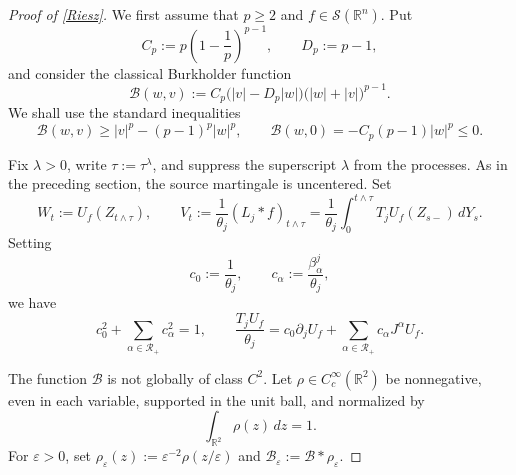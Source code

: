 \documentclass[11pt]{amsart}
\theoremstyle{definition}
\theoremstyle{remark}
\numberwithin{equation}{section}
\newcommand{\R}{\mathbb{R}}
\newcommand{\RR}{\mathcal{R}}
\begin{document}
\begin{proof}[Proof of \cref{Riesz}]
We first assume that $p\geq2$ and $f\in\mathcal S(\R^n)$. Put
\[
C_p:=p\left(1-\frac1p\right)^{p-1},
\qquad D_p:=p-1,
\]
and consider the classical Burkholder function
\[
\mathcal B(w,v)
:=C_p\bigl(|v|-D_p|w|\bigr)\bigl(|w|+|v|\bigr)^{p-1}.
\]
We shall use the standard inequalities
\[
\mathcal B(w,v)\geq|v|^p-(p-1)^p|w|^p,
\qquad
\mathcal B(w,0)=-C_p(p-1)|w|^p\leq0.
\]

Fix $\lambda>0$, write $\tau:=\tau^\lambda$, and suppress the superscript
$\lambda$ from the processes. As in the preceding section, the source martingale is uncentered. Set
\[
W_t:=U_f(Z_{t\wedge\tau}),
\qquad
V_t:=\frac1{\theta_j}(L_j\ast f)_{t\wedge\tau}
=\frac1{\theta_j}\int_0^{t\wedge\tau}T_jU_f(Z_{s-})\,dY_s.
\]
Setting
\[
c_0:=\frac1{\theta_j},
\qquad
c_\alpha:=\frac{\beta_\alpha^j}{\theta_j},
\]
we have
\[
c_0^2+\sum_{\alpha\in\RR_+}c_\alpha^2=1,
\qquad
\frac{T_jU_f}{\theta_j}
=c_0\partial_jU_f+\sum_{\alpha\in\RR_+}c_\alpha J^\alpha U_f.
\]

The function $\mathcal B$ is not globally of class $C^2$. Let
$\rho\in C_c^\infty(\R^2)$ be nonnegative, even in each variable,
supported in the unit ball, and normalized by
\[
\int_{\R^2}\rho(z)\,dz=1.
\]
For $\varepsilon>0$, set
$\rho_\varepsilon(z):=\varepsilon^{-2}\rho(z/\varepsilon)$ and
$\mathcal B_\varepsilon:=\mathcal B*\rho_\varepsilon$.


\end{proof}
\end{document}

